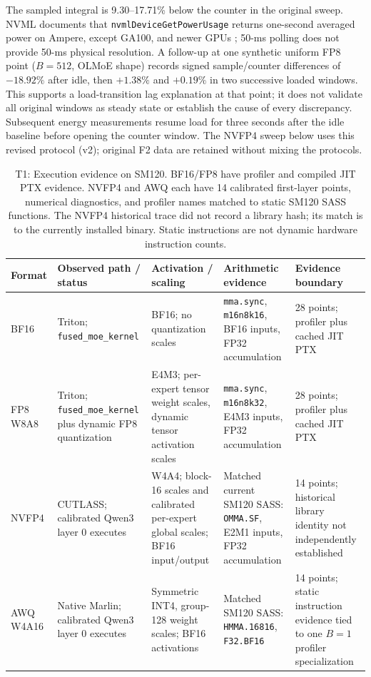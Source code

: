 \documentclass[10pt,twocolumn]{article}
\begin{document}
The sampled integral is 9.30--17.71\% below the counter in the original sweep.
NVML documents that \texttt{nvmlDeviceGetPowerUsage} returns one-second
averaged power on Ampere, except GA100, and newer GPUs \citep{nvmlpower};
50-ms polling does not provide 50-ms physical resolution. A follow-up at one
synthetic uniform FP8 point ($B=512$, OLMoE shape) records signed
sample/counter differences of $-18.92\%$ after idle, then $+1.38\%$ and
$+0.19\%$ in two successive loaded windows. This supports a load-transition
lag explanation at that point; it does not validate all original windows
as steady state or establish the cause of every discrepancy. Subsequent
energy measurements resume load for three seconds after the idle baseline
before opening the counter window. The NVFP4 sweep below uses this revised
protocol (v2); original F2 data are retained without mixing the protocols.

\begin{table}[t]
\centering\small
\caption{T1: Execution evidence on SM120. BF16/FP8 have profiler and compiled
JIT PTX evidence. NVFP4 and AWQ each have 14 calibrated first-layer points,
numerical diagnostics, and profiler names matched to static SM120 SASS
functions. The NVFP4 historical trace did not record a library hash;
its match is to the currently installed binary. Static instructions are
not dynamic hardware instruction counts.}
\label{tab:paths}
\begin{tabularx}{\textwidth}{lYYYY}
\toprule
Format & Observed path / status & Activation / scaling & Arithmetic evidence & Evidence boundary \\
\midrule
BF16 & Triton; \texttt{fused\_moe\_kernel} & BF16; no quantization scales &
\texttt{mma.sync}, \texttt{m16n8k16}, BF16 inputs, FP32 accumulation &
28 points; profiler plus cached JIT PTX \\
FP8 W8A8 & Triton; \texttt{fused\_moe\_kernel} plus dynamic FP8 quantization &
E4M3; per-expert tensor weight scales, dynamic tensor activation scales &
\texttt{mma.sync}, \texttt{m16n8k32}, E4M3 inputs, FP32 accumulation &
28 points; profiler plus cached JIT PTX \\
NVFP4 & CUTLASS; calibrated Qwen3 layer 0 executes &
W4A4; block-16 scales and calibrated per-expert global scales; BF16 input/output &
Matched current SM120 SASS: \texttt{OMMA.SF}, E2M1 inputs, FP32 accumulation &
14 points; historical library identity not independently established \\
AWQ W4A16 & Native Marlin; calibrated Qwen3 layer 0 executes &
Symmetric INT4, group-128 weight scales; BF16 activations &
Matched SM120 SASS: \texttt{HMMA.16816}, \texttt{F32.BF16} &
14 points; static instruction evidence tied to one $B=1$ profiler specialization \\
\bottomrule
\end{tabularx}
\end{table}
\end{document}

